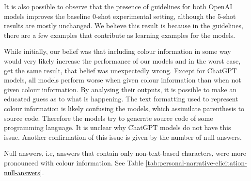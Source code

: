 It is also possible to observe that the presence of guidelines for both OpenAI models improves the baseline 0-shot experimental setting, although the 5-shot results are mostly unchanged. We believe this result is because in the guidelines, there are a few examples that contribute as learning examples for the models.  

While initially, our belief was that including colour information in some way would very likely increase the performance of our models and in the worst case, get the same result, that belief was unexpectedly wrong. Except for ChatGPT models, all models perform worse when given colour information than when not given colour information. By analysing their outputs, it is possible to make an educated guess as to what is happening. The text formatting used to represent colour information is likely confusing the models, which assimilate parenthesis to source code. Therefore the models try to generate source code of some programming language. It is unclear why ChatGPT models do not have this issue. Another confirmation of this issue is given by the number of null answers. 

Null answers, i.e, answers that contain only non-text-based characters, were more pronounced with colour information. See Table \ref{tab:personal-narrative-elicitation-null-answers}.


